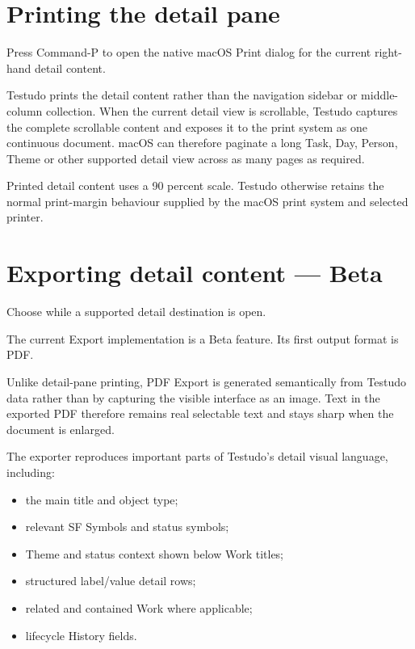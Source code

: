 \documentclass{testudomanual}
\begin{document}


\section{Printing the detail pane}

Press Command-P to open the native macOS Print dialog for the current right-hand detail content.

Testudo prints the detail content rather than the navigation sidebar or middle-column collection. When the current detail view is scrollable, Testudo captures the complete scrollable content and exposes it to the print system as one continuous document. macOS can therefore paginate a long Task, Day, Person, Theme or other supported detail view across as many pages as required.

Printed detail content uses a 90 percent scale. Testudo otherwise retains the normal print-margin behaviour supplied by the macOS print system and selected printer.


\section{Exporting detail content --- Beta}

Choose  while a supported detail destination is open.

The current Export implementation is a Beta feature. Its first output format is PDF.

Unlike detail-pane printing, PDF Export is generated semantically from Testudo data rather than by capturing the visible interface as an image. Text in the exported PDF therefore remains real selectable text and stays sharp when the document is enlarged.

The exporter reproduces important parts of Testudo's detail visual language, including:
\begin{itemize}
    \item the main title and object type;
    \item relevant SF Symbols and status symbols;
    \item Theme and status context shown below Work titles;
    \item structured label/value detail rows;
    \item related and contained Work where applicable;
    \item lifecycle History fields.
\end{itemize}
\end{document}
